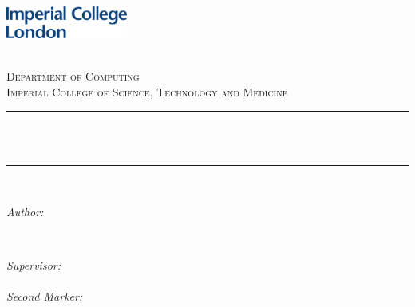 \begin{titlepage}

\newcommand{\HRule}{\rule{\linewidth}{0.5mm}} %


\includegraphics[width = 4cm]{./figures/imperial}\\[0.5cm] 

\center %
 

\textsc{\LARGE \reporttype}\\[1.5cm] 
\textsc{\Large Department of Computing}\\[0.5cm] 
\textsc{\large Imperial College of Science, Technology and Medicine}\\[0.5cm] 


\HRule \\[0.4cm]
{ \huge \bfseries \reporttitle}\\ %
\HRule \\[1.5cm]
 

\begin{minipage}{0.4\textwidth}
\begin{flushleft} \large
\emph{Author:}\\
\reportauthor %
\end{flushleft}
\end{minipage}
~
\begin{minipage}{0.4\textwidth}
\begin{flushright} \large
\emph{Supervisor:} \\
\supervisor\\[5pt] %
\emph{Second Marker:}\\
\secondmarker
\end{flushright}
\end{minipage}\\[4cm]





\end{titlepage}
